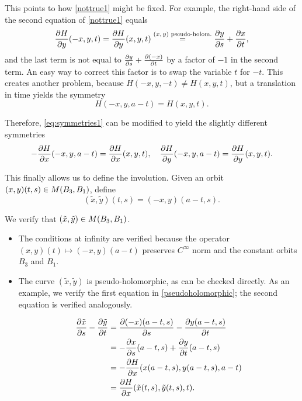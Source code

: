 This points to how \eqref{nottrue1} might be fixed. For example, the right-hand side of the second equation of \eqref{nottrue1} equals
\begin{equation}
\diffp H y (-x,y,t) = \diffp H y (x,y,t) \stackrel{\text{$(x,y)$ pseudo-holom.}}{=} \diffp y s + \diffp{x} t,
\end{equation}
and the last term is not equal to $\diffp y s + \diffp{(-x)} t$ by a factor of $-1$ in the second term. An easy way to correct this factor is to swap the variable $t$ for $-t$. This creates another problem, because $H(-x,y,-t) \neq H(x,y,t)$, but a translation in time yields the symmetry
\begin{equation}
H(-x,y,a - t) = H(x,y,t).
\end{equation}

Therefore, \eqref{eq:symmetries1} can be modified to yield the slightly different symmetries
\begin{equation}
- \diffp H x(-x,y,a-t) = \diffp H x(x,y,t),\quad \diffp H y(-x,y,a-t) = \diffp H y (x,y,t).
\end{equation}

This finally allows us to define the involution. Given an orbit $(x,y)(t,s) \in M(B_3,B_1)$, define
\begin{equation}
(\tilde x, \tilde y)(t,s) = (-x,y)(a-t,s).
\end{equation}

We verify that $(\tilde x, \tilde y) \in M(B_3, B_1)$.
\begin{itemize}
\item The conditions at infinity are verified because the operator $(x,y)(t) \mapsto (-x,y)(a-t)$ preserves $C^\infty$ norm and the constant orbits $B_3$ and $B_1$.

\item The curve $(\tilde x, \tilde y)$ is pseudo-holomorphic, as can be checked directly. As an example, we verify the first equation in \eqref{pseudoholomorphic}; the second equation is verified analogously.

\begin{equation}
\begin{aligned}
\diffp{\tilde x}s - \diffp{\tilde y}t &= \diffp{(-x)(a-t,s)}s - \diffp{y(a-t,s)}t\\
&= - \diffp x s(a-t, s) + \diffp y t(a-t, s)\\
&= - \diffp H x (x(a-t,s), y(a-t,s), a-t)\\
&= \diffp H x (\tilde x(t, s), \tilde y(t, s), t).
\end{aligned}
\end{equation}
\end{itemize}

